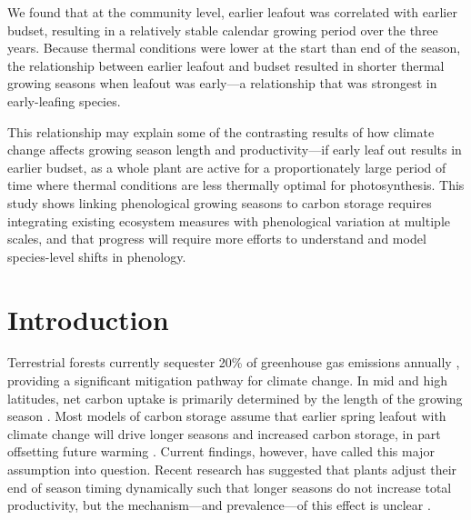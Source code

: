 \documentclass{article}[12pt]
\begin{document}
We found that at the community level, earlier leafout was correlated with earlier budset, resulting in a relatively stable calendar growing period over the three years.  Because thermal conditions were lower at the start than end of the season,  the relationship between earlier leafout and budset resulted in shorter thermal growing seasons when leafout was early---a relationship that was strongest in early-leafing species. 

This relationship may explain some of the contrasting results of how climate change affects growing season length and productivity---if early leaf out results in earlier budset, as a whole plant are active for a proportionately large period of time where thermal conditions are less thermally optimal for photosynthesis. This study shows linking phenological growing seasons to carbon storage requires integrating existing ecosystem measures with phenological variation at multiple scales, and that progress will require more efforts to understand and model species-level shifts in phenology.

\section{Introduction}
Terrestrial forests currently sequester 20\% of greenhouse gas emissions annually  \citep{shanley2024, roe2021}, providing a significant mitigation pathway for climate change. In mid and high latitudes, net carbon uptake is primarily determined by the length of the growing season \citep{White1999}. Most models of carbon storage assume that earlier spring leafout with climate change will drive longer seasons and increased carbon storage, in part offsetting future warming \citep{Churkina2005,White1999,Keenan2014}. Current findings, however, have called this major assumption into question. Recent research has suggested that plants adjust their end of season timing dynamically such that longer seasons do not increase total productivity, but the mechanism---and prevalence---of this effect is unclear \citep{Zani2020,Norby2021,Zohner2023}.
\end{document}
